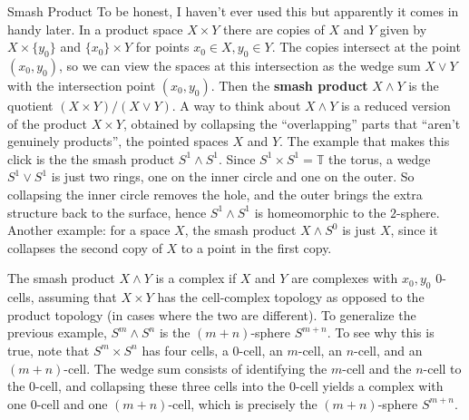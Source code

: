 \begin{namedthing}{Smash Product}
    To be honest, I haven't ever used this but apparently it comes in handy later. In a product space $X\times Y$ there are copies of $X$ and $Y$ given by $X\times \{y_0\} $ and $\{x_0\} \times Y$ for points $x_0\in X,y_0\in Y$. The copies intersect at the point $(x_0,y_0)$, so we can view the spaces at this intersection as the wedge sum $X\vee Y$ with the intersection point $(x_0,y_0)$. Then the \textbf{smash product} $X\wedge Y$ is the quotient $(X\times Y) / (X\vee Y)$. A way to think about $X\wedge Y$ is a reduced version of the product $X\times Y$, obtained by collapsing the ``overlapping'' parts that ``aren't genuinely products'', the pointed spaces $X$ and $Y$. The example that makes this click is the the smash product $S^1 \wedge  S^1 $. Since $S^1 \times S^1 =\mathbb{T}$ the torus, a wedge $S^1 \vee S^1 $ is just two rings, one on the inner circle and one on the outer. So collapsing the inner circle removes the hole, and the outer brings the extra structure back to the surface, hence $S^1 \wedge S^1 $ is homeomorphic to the $2$-sphere. Another example: for a space $X$, the smash product $X\wedge S^0$ is just $X$, since it collapses the second copy of $X$ to a point in the first copy.

    The smash product $X\wedge Y$ is a complex if $X$ and $Y$ are complexes with $x_0,y_0$ $0$-cells, assuming that $X\times Y$ has the cell-complex topology as opposed to the product topology (in cases where the two are different). To generalize the previous example, $S^m\wedge S^n $ is the $(m+n)$-sphere $S^{m+n}$. To see why this is true, note that $S^m \times S^n $ has four cells, a $0$-cell, an $m$-cell, an $n$-cell, and an $(m+n)$-cell. The wedge sum consists of identifying the $m$-cell and the $n$-cell to the $0$-cell, and collapsing these three cells into the $0$-cell yields a complex with one $0$-cell and one $(m+n)$-cell, which is precisely the $(m+n)$-sphere $S^{m+n}$.
\end{namedthing}
